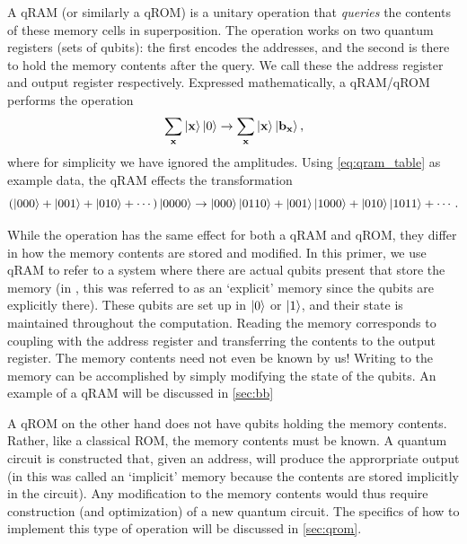 \documentclass[a4paper,12pt]{article}
\begin{document}
A qRAM (or similarly a qROM) is a unitary operation that \emph{queries} the contents of these memory cells in superposition. 
The operation works on two quantum registers (sets of qubits): the first encodes the addresses, and the second is there to hold the memory contents after the query.
We call these the address register and output register respectively.
Expressed mathematically, a qRAM/qROM performs the operation
\begin{equation}
 \sum_{\mathbf{x}} \ket{\mathbf{x}} \ket{0} \rightarrow \sum_{\mathbf{x}} \ket{\mathbf{x}} \ket{\mathbf{b}_{\mathbf{x}}},
\end{equation}
where for simplicity we have ignored the amplitudes.
Using \autoref{eq:qram_table} as example data, the qRAM effects the transformation
\begin{equation}
 \left(\ket{000} + \ket{001} + \ket{010} + \cdots \right) \ket{0000} \rightarrow \ket{000}\ket{0110} + \ket{001}\ket{1000} + \ket{010}\ket{1011} + \cdots. 
\end{equation}

While the operation has the same effect for both a qRAM and qROM, they differ in how the memory contents are stored and modified.
In this primer, we use qRAM to refer to a system where there are actual qubits present that store the memory (in \cite{DiMatteo2020}, this was referred to as an `explicit' memory since the qubits are explicitly there).
These qubits are set up in $\ket{0}$ or $\ket{1}$, and their state is maintained throughout the computation.
Reading the memory corresponds to coupling with the address register and transferring the contents to the output register.
The memory contents need not even be known by us!
Writing to the memory can be accomplished by simply modifying the state of the qubits.
An example of a qRAM will be discussed in \autoref{sec:bb}

A qROM on the other hand does not have qubits holding the memory contents.
Rather, like a classical ROM, the memory contents must be known.
A quantum circuit is constructed that, given an address, will produce the approrpriate output (in \cite{DiMatteo2020} this was called an `implicit' memory because the contents are stored implicitly in the circuit).
Any modification to the memory contents would thus require construction (and optimization) of a new quantum circuit.
The specifics of how to implement this type of operation will be discussed in \autoref{sec:qrom}.
\end{document}

